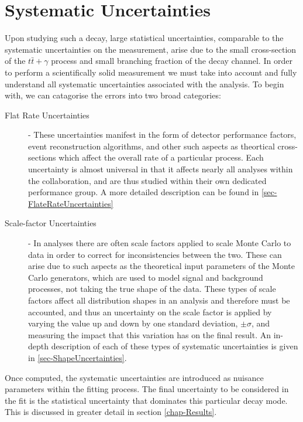 \chapter{Systematic Uncertainties} \label{chap-SystematicUncertainties}



Upon studying such a decay, large statistical uncertainties, comparable to the systematic uncertainties on the measurement, arise due to the small cross-section of the $t\bar{t}+\gamma$ process and small branching fraction of the decay channel. In order to perform a scientifically solid measurement we must take into account and fully understand all systematic uncertainties associated with the analysis. To begin with, we can catagorise the errors into two broad categories:

\begin{description}
	\item[Flat Rate Uncertainties] - These uncertainties manifest in the form of detector performance factors, event reconstruction algorithms, and other such aspects as theortical cross-sections which affect the overall rate of a particular process. Each uncertainty is almost universal in that it affects nearly all analyses within the collaboration, and are thus studied within their own dedicated performance group. A more detailed description can be found in \ref{sec-FlateRateUncertainties}  
	\item[Scale-factor Uncertainties] - In analyses there are often scale factors applied to scale Monte Carlo to data in order to correct for inconsistencies between the two. These can arise due to such aspects as the theoretical input parameters of the Monte Carlo generators, which are used to model signal and background processes, not taking the true shape of the data. These types of scale factors affect all distribution shapes in an analysis and therefore must be accounted, and thus an uncertainty on the scale factor is applied by varying the value up and down by one standard deviation, $\pm \sigma$, and measuring the impact that this variation has on the final result. An in-depth description of each of these types of systematic uncertainties is given in \ref{sec-ShapeUncertainties}.
\end{description}

Once computed, the systematic uncertainties are introduced as nuisance parameters within the fitting process. The final uncertainty to be considered in the fit is the statistical uncertainty that dominates this particular decay mode. This is discussed in greater detail in section \ref{chap-Results}.

